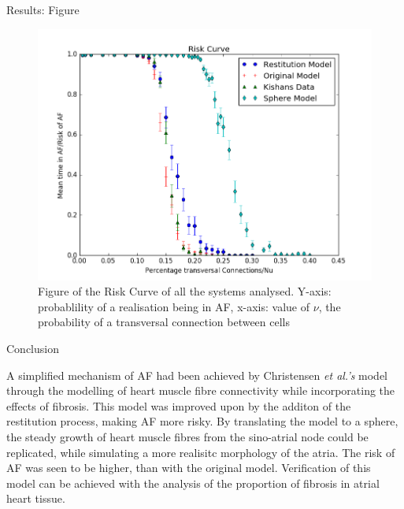 \documentclass[final,hyperref={pdfpagelabels=false}]{beamer}
\begin{document}
\begin{frame}[t]
\begin{column}{.465\textwidth}
\begin{block}{Results: Figure}
\begin{figure}
\includegraphics[width=0.8\linewidth]{xriskcurvesphere}
\caption{Figure of the Risk Curve of all the systems analysed. Y-axis: probablility of a realisation being in AF, x-axis: value of $\nu$, the  probability of a transversal connection between cells}
\end{figure}

\end{block}


\begin{block}{Conclusion}
\begin{itemize}
A simplified mechanism of AF had been achieved by Christensen \emph{et al.'s} model through the modelling of heart muscle fibre connectivity while incorporating the effects of fibrosis. This model was improved upon by the additon of the restitution process, making AF more risky. By translating the model to a sphere, the steady growth of heart muscle fibres from the sino-atrial node could be replicated, while simulating a more realisitc morphology of the atria. The risk of AF was seen to be higher, than with the original model. Verification of this model can be achieved with the analysis of the proportion of fibrosis in atrial heart tissue. 
\end{itemize}
\end{block}



\end{column}
\end{frame}
\end{document}
